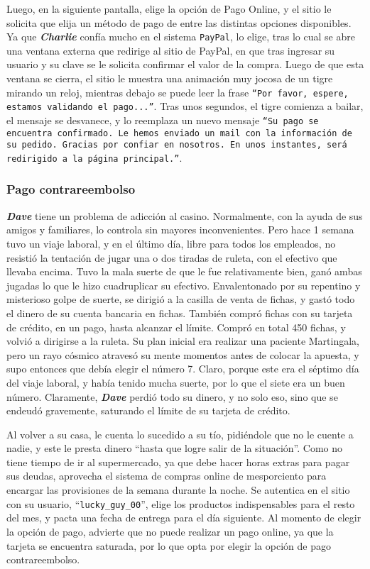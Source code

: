 Luego, en la siguiente pantalla, elige la opción de Pago Online, y el sitio le
solicita que elija un método de pago de entre las distintas opciones
disponibles. Ya que \textbf{\emph{Charlie}} confía mucho en el sistema
\texttt{PayPal}, lo elige, tras lo cual se abre una ventana externa que redirige
al sitio de PayPal, en que tras ingresar su usuario y su clave se le solicita
confirmar el valor de la compra. Luego de que esta ventana se cierra, el sitio
le muestra una animación muy jocosa de un tigre mirando un reloj, mientras
debajo se puede leer la frase \texttt{``Por favor, espere, estamos validando el
pago...''}. Tras unos segundos, el tigre comienza a bailar, el mensaje se
desvanece, y lo reemplaza un nuevo mensaje \texttt{``Su pago se encuentra
confirmado. Le hemos enviado un mail con la información de su pedido. Gracias
por confiar en nosotros. En unos instantes, será redirigido a la página
principal.''}.

\subsubsection{Pago contrareembolso}

\textbf{\emph{Dave}} tiene un problema de adicción al casino. Normalmente, con
la ayuda de sus amigos y familiares, lo controla sin mayores inconvenientes.
Pero hace 1 semana tuvo un viaje laboral, y en el último día, libre para todos
los empleados, no resistió la tentación de jugar una o dos tiradas de ruleta,
con el efectivo que llevaba encima. Tuvo la mala suerte de que le fue
relativamente bien, ganó ambas jugadas lo que le hizo cuadruplicar su efectivo.
Envalentonado por su repentino y misterioso golpe de suerte, se dirigió a la
casilla de venta de fichas, y gastó todo el dinero de su cuenta bancaria en
fichas. También compró fichas con su tarjeta de crédito, en un pago, hasta
alcanzar el límite. Compró en total 450 fichas, y volvió a dirigirse a la
ruleta. Su plan inicial era realizar una paciente Martingala, pero un rayo
cósmico atravesó su mente momentos antes de colocar la apuesta, y supo entonces
que debía elegir el número 7. Claro, porque este era el séptimo día del viaje
laboral, y había tenido mucha suerte, por lo que el siete era un buen número.
Claramente, \textbf{\emph{Dave}} perdió todo su dinero, y no solo eso, sino que
se endeudó gravemente, saturando el límite de su tarjeta de crédito.

Al volver a su casa, le cuenta lo sucedido a su tío, pidiéndole que no le cuente
a nadie, y este le presta dinero ``hasta que logre salir de la situación''. Como
no tiene tiempo de ir al supermercado, ya que debe hacer horas extras para pagar
sus deudas, aprovecha el sistema de compras online de mesporciento para encargar
las provisiones de la semana durante la noche. Se autentica en el sitio con su
usuario, ``\texttt{lucky\_guy\_00}'', elige los productos indispensables para el
resto del mes, y pacta una fecha de entrega para el día siguiente. Al momento de
elegir la opción de pago, advierte que no puede realizar un pago online, ya que
la tarjeta se encuentra saturada, por lo que opta por elegir la opción de pago
contrareembolso.

